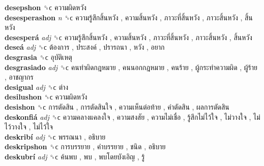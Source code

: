 \textbf{desepshon} ␝ϲ   ความผิดหวัง   \\
\textbf{desesperashon} \emph{n}  ␝ϲ   ความรู้สึกสิ้นหวัง ,  ความสิ้นหวัง ,  ภาวะที่สิ้นหวัง ,  ภาวะสิ้นหวัง ,  สิ้นหวัง   \\
\textbf{desesperá} \emph{adj}  ␝ϲ   ความรู้สึกสิ้นหวัง ,  ความสิ้นหวัง ,  ภาวะที่สิ้นหวัง ,  ภาวะสิ้นหวัง ,  สิ้นหวัง   \\
\textbf{deseá} \emph{adj}  ␝ϲ   ต้องการ ,  ประสงค์ ,  ปรารถนา ,  หวัง ,  อยาก   \\
\textbf{desgrasia} ␝ϲ   อุบัติเหตุ   \\
\textbf{desgrasiado} \emph{adj}  ␝ϲ   คนทำผิดกฎหมาย ,  คนนอกกฎหมาย ,  คนร้าย ,  ผู้กระทำความผิด ,  ผู้ร้าย ,  อาชญากร   \\
\textbf{desigual} \emph{adj}  ␝ϲ   ต่าง   \\
\textbf{desilushon} ␝ϲ   ความผิดหวัง   \\
\textbf{desishon} ␝ϲ   การตัดสิน ,  การตัดสินใจ ,  ความเห็นต่อท้าย ,  คำตัดสิน ,  ผลการตัดสิน   \\
\textbf{deskonfiá} \emph{adj}  ␝ϲ   ความคลางแคลงใจ ,  ความสงสัย ,  ความไม่เชื่อ ,  รู้สึกไม่ไว้ใจ ,  ไม่วางใจ ,  ไม่ไว้วางใจ ,  ไม่ไว้ใจ   \\
\textbf{deskribí} \emph{adj}  ␝ϲ   พรรณนา ,  อธิบาย   \\
\textbf{deskripshon} ␝ϲ   การบรรยาย ,  คำบรรยาย ,  ชนิด ,  อธิบาย   \\
\textbf{deskubrí} \emph{adj}  ␝ϲ   ค้นพบ ,  พบ ,  พบโดยบังเอิญ ,  รู้   \\
